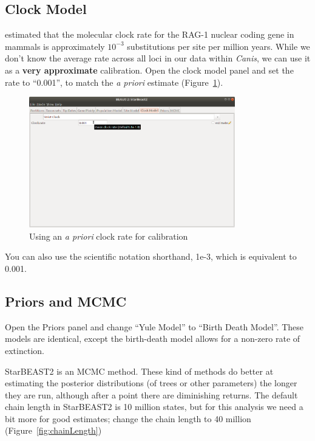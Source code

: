 \documentclass[12pt]{article}
\begin{document}
\subsection{Clock Model}
\label{subsec:clockModel}

\cite{Hugall2007} estimated that the molecular
clock rate for the RAG-1 nuclear coding gene in mammals is approximately
$10^{-3}$ substitutions per site per million years. While we don't know
the average rate across all loci in our data within \textit{Canis}, we can
use it as a \textbf{very approximate} calibration. Open the clock model panel
and set the rate to ``0.001'', to match the \textit{a priori} estimate
(Figure~\ref{fig:strictClockModel}).

\begin{figure}[htb!]
\centering
\includegraphics[width=0.8\textwidth]{figures/strictClockModel.png}
\caption
{Using an \textit{a priori} clock rate for calibration}
\label{fig:strictClockModel}
\end{figure}

You can also use the scientific notation shorthand, 1e-3, which is equivalent
to 0.001.

\subsection{Priors and MCMC}
\label{subsec:MCMC}

Open the Priors panel and change ``Yule Model'' to ``Birth Death Model''.
These models are identical, except the birth-death model allows for a
non-zero rate of extinction.

StarBEAST2 is an MCMC method. These kind of methods do better at estimating
the posterior distributions (of trees or other parameters) the longer they
are run, although after a point there are diminishing returns. The default
chain length in StarBEAST2 is 10 million states, but for this analysis we
need a bit more for good estimates; change the chain length to 40 million
(Figure~\ref{fig:chainLength})
\end{document}
